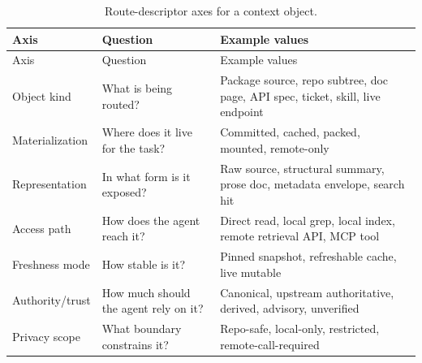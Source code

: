 \documentclass[
  11pt,
  letterpaper,
  numbers=noendperiod,
  parskip=half]{scrartcl}
\begin{document}
\begin{longtable}[]{@{}
  >{\raggedright\arraybackslash}p{}
  >{\raggedright\arraybackslash}p{}
  >{\raggedright\arraybackslash}p{}@{}}
\caption{Route-descriptor axes for a context
object.}\label{tbl-route-descriptor}\tabularnewline
\toprule\noalign{}
\begin{minipage}[b]{\linewidth}\raggedright
Axis
\end{minipage} & \begin{minipage}[b]{\linewidth}\raggedright
Question
\end{minipage} & \begin{minipage}[b]{\linewidth}\raggedright
Example values
\end{minipage} \\
\midrule\noalign{}
\endfirsthead
\toprule\noalign{}
\begin{minipage}[b]{\linewidth}\raggedright
Axis
\end{minipage} & \begin{minipage}[b]{\linewidth}\raggedright
Question
\end{minipage} & \begin{minipage}[b]{\linewidth}\raggedright
Example values
\end{minipage} \\
\midrule\noalign{}
\endhead
\bottomrule\noalign{}
\endlastfoot
Object kind & What is being routed? & Package source, repo subtree, doc
page, API spec, ticket, skill, live endpoint \\
Materialization & Where does it live for the task? & Committed, cached,
packed, mounted, remote-only \\
Representation & In what form is it exposed? & Raw source, structural
summary, prose doc, metadata envelope, search hit \\
Access path & How does the agent reach it? & Direct read, local grep,
local index, remote retrieval API, MCP tool \\
Freshness mode & How stable is it? & Pinned snapshot, refreshable cache,
live mutable \\
Authority/trust & How much should the agent rely on it? & Canonical,
upstream authoritative, derived, advisory, unverified \\
Privacy scope & What boundary constrains it? & Repo-safe, local-only,
restricted, remote-call-required \\
\end{longtable}
\end{document}
